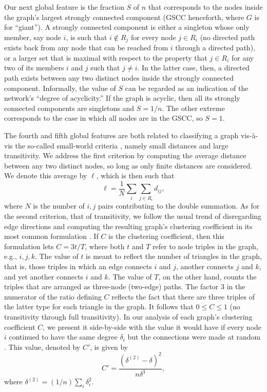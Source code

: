\documentclass{article}
\begin{document}
Our next global feature is the fraction $S$ of $n$ that corresponds to the nodes
inside the graph's largest strongly connected component (GSCC henceforth, where
$G$ is for ``giant''). A strongly connected component is either a singleton
whose only member, say node $i$, is such that $i\notin R_j$ for every node
$j\in R_i$ (no directed path exists back from any node that can be reached from
$i$ through a directed path), or a larger set that is maximal with respect to
the property that $j\in R_i$ for any two of its members $i$ and $j$ such that
$j\neq i$. In the latter case, then, a directed path exists between any two
distinct nodes inside the strongly connected component. Informally, the value of
$S$ can be regarded as an indication of the network's ``degree of acyclicity.''
If the graph is acyclic, then all its strongly connected components are
singletons and $S=1/n$. The other extreme corresponds to the case in which all
nodes are in the GSCC, so $S=1$.

The fourth and fifth global features are both related to classifying a graph
vis-\`{a}-vis the so-called small-world criteria \cite{ws98,ajb99}, namely small
distances and large transitivity. We address the first criterion by computing
the average distance between any two distinct nodes, so long as only finite
distances are considered. We denote this average by $\ell$, which is then such
that
\begin{equation}
\ell=\frac{1}{N}\sum_i\sum_{j\in R_i}d_{ij},
\end{equation}
where $N$ is the number of $i,j$ pairs contributing to the double summation. As
for the second criterion, that of transitivity, we follow the usual trend of
disregarding edge directions and computing the resulting graph's clustering
coefficient in its most common formulation \cite{n10}. If $C$ is the clustering
coefficient, then this formulation lets $C=3t/T$, where both $t$ and $T$ refer
to node triples in the graph, e.g., $i,j,k$. The value of $t$ is meant to
reflect the number of triangles in the graph, that is, those triples in which an
edge connects $i$ and $j$, another connects $j$ and $k$, and yet another
connects $i$ and $k$. The value of $T$, on the other hand, counts the triples
that are arranged as three-node (two-edge) paths. The factor $3$ in the
numerator of the ratio defining $C$ reflects the fact that there are three
triples of the latter type for each triangle in the graph. It follows that
$0\le C\le 1$ (no transitivity through full transitivity). In our analysis of
each graph's clustering coefficient $C$, we present it side-by-side with the
value it would have if every node $i$ continued to have the same degree
$\delta_i$ but the connections were made at random \cite{n10}. This value,
denoted by $C'$, is given by
\begin{equation}
C'=\frac{(\delta^{(2)}-\delta)^2}{n\delta^3},
\end{equation}
where $\delta^{(2)}=(1/n)\sum_i\delta_i^2$.
\end{document}

